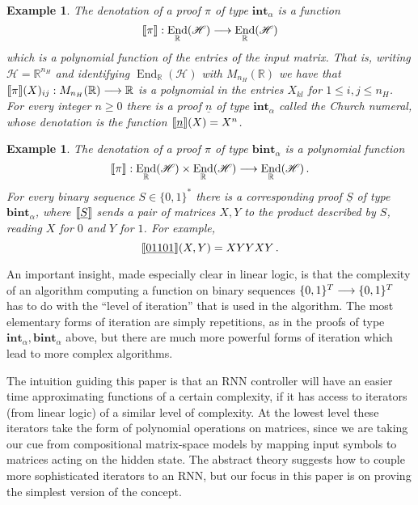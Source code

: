 \documentclass[english,letter paper,12pt,leqno]{article}
\theoremstyle{example}
\newtheorem{example}[theorem]{Example}
\numberwithin{equation}{section}
\DeclareMathOperator{\End}{End}
\begin{document}
\begin{example}\label{example_1} The \emph{denotation} of a proof $\pi$ of type $\textbf{int}_\alpha$ is a function
\[
\den{\pi}: \End_{\mathbb{R}}(\mathscr{H}) \lto \End_{\mathbb{R}}(\mathscr{H})
\]
which is a polynomial function of the entries of the input matrix. That is, writing $\mathscr{H} = \mathbb{R}^{n_H}$ and identifying $\End_{\mathbb{R}}(\mathscr{H})$ with $M_{n_H}(\mathbb{R})$ we have that $\llbracket \pi \rrbracket(X)_{ij}: M_{n_H}(\mathbb{R}) \longrightarrow \mathbb{R}$ is a polynomial in the entries $X_{kl}$ for $1 \le i, j \le n_H$. For every integer $n \ge 0$ there is a proof $\underline{n}$ of type $\textbf{int}_\alpha$ called the \emph{Church numeral}, whose denotation is the function $\llbracket \underline{n} \rrbracket(X) = X^n$.
\end{example}

\begin{example}\label{example_2} The denotation of a proof $\pi$ of type $\textbf{bint}_\alpha$ is a polynomial function
\[
\den{\pi}: \End_{\mathbb{R}}(\mathscr{H}) \times \End_{\mathbb{R}}(\mathscr{H}) \lto \End_{\mathbb{R}}(\mathscr{H})\,.
\]
For every binary sequence $S \in \{0,1\}^*$ there is a corresponding proof $\underline{S}$ of type $\textbf{bint}_\alpha$, where $\llbracket \underline{S} \rrbracket$ sends a pair of matrices $X,Y$ to the product described by $S$, reading $X$ for $0$ and $Y$ for $1$. For example,
\[
\llbracket \underline{01101} \rrbracket(X,Y) = X Y Y X Y\,.
\]
\end{example}

An important insight, made especially clear in linear logic, is that the complexity of an algorithm computing a function on binary sequences $\{0,1\}^T \longrightarrow \{0,1\}^T$ has to do with the ``level of iteration'' that is used in the algorithm. The most elementary forms of iteration are simply repetitions, as in the proofs of type $\textbf{int}_\alpha, \textbf{bint}_\alpha$ above, but there are much more powerful forms of iteration which lead to more complex algorithms.

The intuition guiding this paper is that an RNN controller will have an easier time approximating functions of a certain complexity, if it has access to iterators (from linear logic) of a similar level of complexity. At the lowest level these iterators take the form of polynomial operations on matrices, since we are taking our cue from compositional matrix-space models by mapping input symbols to matrices acting on the hidden state. The abstract theory suggests how to couple more sophisticated iterators to an RNN, but our focus in this paper is on proving the simplest version of the concept.
\\
\end{document}
